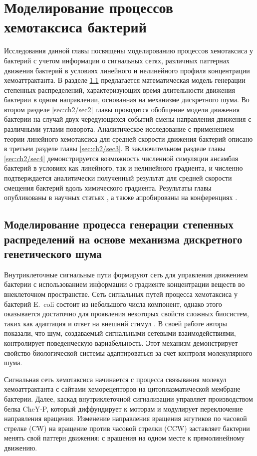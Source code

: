 \chapter{Моделирование процессов хемотаксиса бактерий}\label{ch:ch2}

Исследования данной главы посвящены моделированию процессов хемотаксиса у бактерий с учетом информации о сигнальных сетях, различных паттернах движения бактерий в условиях линейного и нелинейного профиля концентрации хемоаттрактанта. В разделе \cref{sec:ch2/sec1} предлагается математическая модель генерации степенных распределений, характеризующих время длительности движения бактерии в одном направлении, основанная на механизме дискретного шума. Во втором разделе \cref{sec:ch2/sec2} главы проводится обобщение модели движения бактерии на случай двух чередующихся событий смены направления движения с различными углами поворота. Аналитическое исследование с применением теории линейного хемотаксиса для средней скорости движения бактерий описано в третьем разделе главы \cref{sec:ch2/sec3}. В заключительном разделе главы \cref{sec:ch2/sec4} демонстрируется возможность численной симуляции ансамбля бактерий в условиях как линейного, так и нелинейного градиента, и численно подтверждается аналитически полученный результат для средней скорости смещения бактерий вдоль химического градиента. Результаты главы опубликованы в научных статьях \cite{bib1,bib2}, а также апробированы на конференциях \cite{confbib5,confbib6}.  

\section{Моделирование процесса генерации степенных распределений на основе механизма дискретного генетического шума}\label{sec:ch2/sec1}
Внутриклеточные сигнальные пути формируют сеть для управления движением бактерии с использованием информации о градиенте концентрации веществ во внеклеточном пространстве. Сеть сигнальных путей процесса хемотаксиса у бактерий E.~coli состоит из небольшого числа компонент, однако этого оказывается достаточно для проявления некоторых свойств сложных биосистем, таких как адаптация и ответ на внешний стимул \cite{korobkova_molecular_2004}. В своей работе авторы показали, что шум, создаваемый сигнальными сетевыми взаимодействиями, контролирует поведенческую вариабельность. Этот механизм демонстрирует свойство биологической системы адаптироваться за счет контроля молекулярного шума. 

Сигнальная сеть хемотаксиса начинается с процесса связывания молекул хемоаттрактанта с сайтами хеморецепторов на цитоплазматической мембране бактерии. Далее, каскад внутриклеточной сигнализации управляет производством белка CheY-P, который диффундирует к моторам и модулирует переключение направления вращения. Изменение направления вращения жгутиков по часовой стрелке (CW) на вращение против часовой стрелки (CCW) заставляет бактерии менять свой паттерн движения: с вращения на одном месте к прямолинейному движению.

